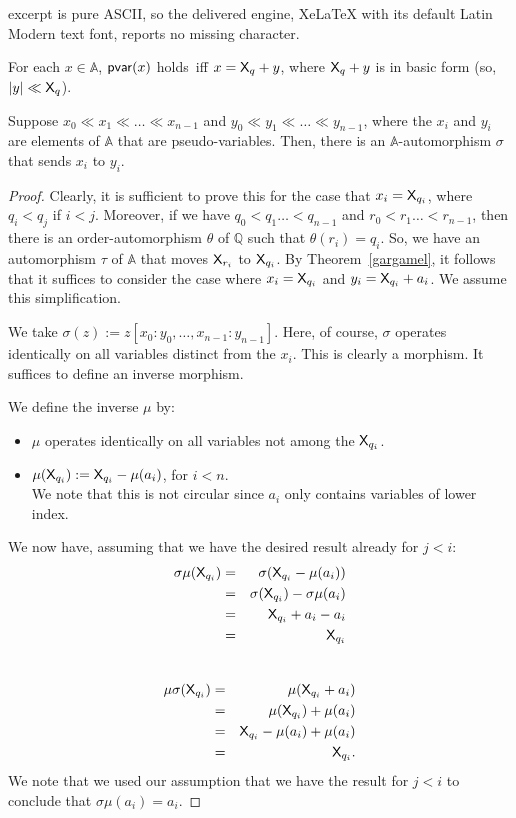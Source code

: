\documentclass[10pt,a4paper]{amsart}
\newcommand{\X}{{\sf X}}
\newcommand{\psv}{{\sf pvar}}
\newcommand{\psvar}{pseudo-variables}
\begin{document}
excerpt is pure ASCII, so the delivered engine, XeLaTeX with its default Latin Modern text font, reports no missing character.
\begin{theorem}\label{gargamel}
For each $x\in\mathbb{A}$, $\psv(x)$ holds\ iff $x= \X_q+y$, where $\X_q+y$ is in basic form 
\textup(so, $|y| \ll \X_q$\textup).
\end{theorem}

\begin{theorem}\label{autosmurf}
Suppose $x_0 \ll x_1 \ll \dots \ll x_{n-1}$ and $y_0 \ll y_1 \ll \dots \ll y_{n-1}$, where the $x_i$ and $y_i$  
are elements of $\mathbb{A}$ that are \psvar. Then, there is an $\mathbb A$-automorphism $\sigma$ that sends $x_i$ to $y_i$.
\end{theorem}

\begin{proof}
Clearly, it is sufficient to prove this for the case that $x_i = \X_{q_i}$, where $q_i<q_j$ if $i<j$. 
Moreover, if we have $q_0 < q_1 \dots < q_{n-1}$ and $r_0 < r_1 \dots < r_{n-1}$, then there is
an order-automorphism $\theta$ of $\mathbb Q$ such that $\theta(r_i)=q_i$. 
So, we have an automorphism $\tau$ of $\mathbb A$ that moves $\X_{r_i}$ to $\X_{q_i}$.
By Theorem~\ref{gargamel}, it follows that it suffices to consider the case where $x_i= \X_{q_i}$ and $y_i = \X_{q_i}+a_i$.
We assume this simplification.

We take $\sigma(z) := z[x_0:y_0,\dots,x_{n-1}:y_{n-1}]$. Here, of course, $\sigma$ operates identically on all 
variables distinct from the $x_i$. This is clearly a morphism. It suffices to define
an inverse morphism.

We define the inverse  $\mu$ by:
\begin{itemize}
\item
$\mu$ operates identically on all variables not among the $\X_{q_i}$.
\item
$\mu(\X_{q_i}) := \X_{q_i} - \mu(a_i)$, for $i<n$.\\
We note that this is not circular since $a_i$ only contains
variables of lower index.
\end{itemize}
 We now have, assuming that we have the desired result already for $j<i$:
 \begin{eqnarray*}
 \sigma\mu (\X_{q_i}) & = &  \sigma(\X_{q_i} - \mu(a_i)) \\
 & = & \sigma(\X_{q_i}) - \sigma\mu(a_i) \\
 & = & \X_{q_i}+a_i -a_i \\
 &= & \X_{q_i}
 \end{eqnarray*}
  \\
 \begin{eqnarray*}
  \mu\sigma (\X_{q_i}) & = &  \mu(\X_{q_i} + a_i) \\
  & = & \mu (\X_{q_i}) + \mu(a_i) \\
  & = & \X_{q_i}-\mu(a_i)+\mu(a_i) \\
  & = & \X_{q_i}.
 \end{eqnarray*}
 We note that we used our assumption that we have the result for $j<i$ to conclude  that $\sigma\mu(a_i) = a_i$.
\end{proof}
\end{document}
